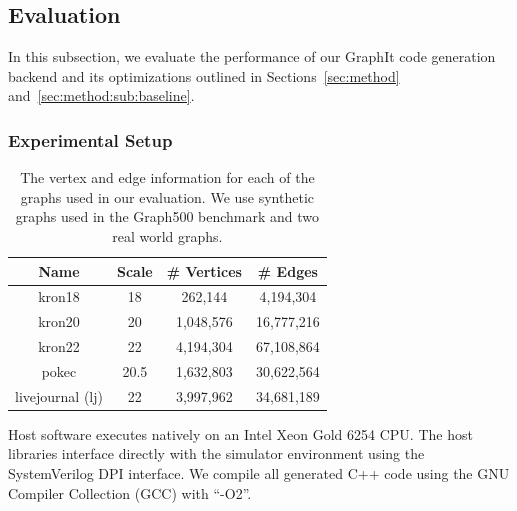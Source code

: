 %

\subsection{Evaluation} \label{sec:eval}
In this subsection, we evaluate the performance of our GraphIt code generation backend and its optimizations outlined in Sections~\ref{sec:method} and~\ref{sec:method:sub:baseline}.

\subsubsection{Experimental Setup}

\begin{table}[]
    \centering
    \begin{tabular}{c|c|c|c}
     \textbf{Name} & \textbf{Scale} & \textbf{\# Vertices} & \textbf{\# Edges} \\ \hline %
     kron18 & 18 & 262,144 & 4,194,304 \\ \hline
     kron20 & 20 & 1,048,576 & 16,777,216 \\ \hline
     kron22 & 22 & 4,194,304 & 67,108,864 \\ \hline
     pokec & 20.5 & 1,632,803 & 30,622,564 \\ \hline
     livejournal (lj) & 22 & 3,997,962 & 34,681,189 \\ %
    \end{tabular}
    
    \caption{The vertex and edge information for each of the graphs used in our evaluation. We use synthetic \kron graphs used in the Graph500 benchmark and two real world graphs.}
    \label{sec:eval:tab:graphs}
\end{table}

Host software executes natively on an Intel Xeon Gold 6254 CPU.
The host libraries interface directly with the simulator environment using the SystemVerilog DPI interface.
We compile all generated C++ code using the GNU Compiler Collection (GCC) with ``-O2''.

